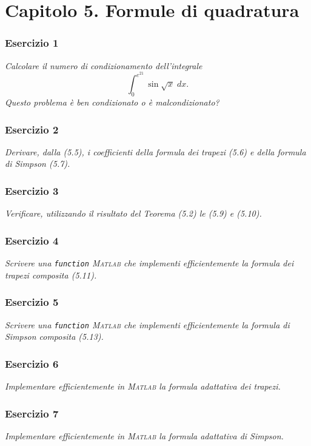 \chapter{Capitolo 5. Formule di quadratura}
\label{chap:Capitolo 5. Formule di quadratura}

\subsection{Esercizio 1}
\label{sub:es1}
\emph{Calcolare il numero di condizionamento dell'integrale
$$\int_0^{e^{21}}\sin\sqrt{x}\;dx.$$
Questo problema è ben condizionato o è malcondizionato?}


\subsection{Esercizio 2}
\label{sub:es2}
\emph{Derivare, dalla (5.5), i coefficienti della formula dei trapezi (5.6) e della formula di Simpson (5.7).}

\subsection{Esercizio 3}
\label{sub:es3}
\emph{Verificare, utilizzando il risultato del Teorema (5.2) le (5.9) e (5.10).}

\subsection{Esercizio 4}
\label{sub:es4}
\emph{Scrivere una \lstinline{function} \textsc{Matlab} che implementi efficientemente la formula dei trapezi composita (5.11).}

\subsection{Esercizio 5}
\label{sub:es5}
\emph{Scrivere una \lstinline{function} \textsc{Matlab} che implementi efficientemente la formula di Simpson composita (5.13).}

\subsection{Esercizio 6}
\label{sub:es6}
\emph{Implementare efficientemente in \textsc{Matlab} la formula adattativa dei trapezi.}

\subsection{Esercizio 7}
\label{sub:es7}
\emph{Implementare efficientemente in \textsc{Matlab} la formula adattativa di Simpson.}

